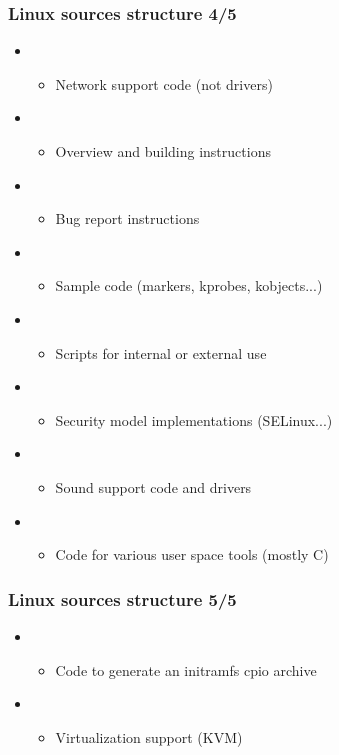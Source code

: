 \begin{frame}
  \frametitle{Linux sources structure 4/5}
  \begin{itemize}
  \item {}
    \begin{itemize}
    \item Network support code (not drivers)
    \end{itemize}
  \item {}
    \begin{itemize}
    \item Overview and building instructions
    \end{itemize}
  \item {}
    \begin{itemize}
    \item Bug report instructions
    \end{itemize}
  \item {}
    \begin{itemize}
    \item Sample code (markers, kprobes, kobjects...)
    \end{itemize}
  \item {}
    \begin{itemize}
    \item Scripts for internal or external use
    \end{itemize}
  \item {}
    \begin{itemize}
    \item Security model implementations (SELinux...)
    \end{itemize}
  \item {}
    \begin{itemize}
    \item Sound support code and drivers
    \end{itemize}
  \item {}
    \begin{itemize}
    \item Code for various user space tools (mostly C)
    \end{itemize}
  \end{itemize}
\end{frame}

\begin{frame}
  \frametitle{Linux sources structure 5/5}
  \begin{itemize}
  \item {}
    \begin{itemize}
    \item Code to generate an initramfs cpio archive
    \end{itemize}
  \item {}
    \begin{itemize}
    \item Virtualization support (KVM)
    \end{itemize}
  \end{itemize}
\end{frame}
